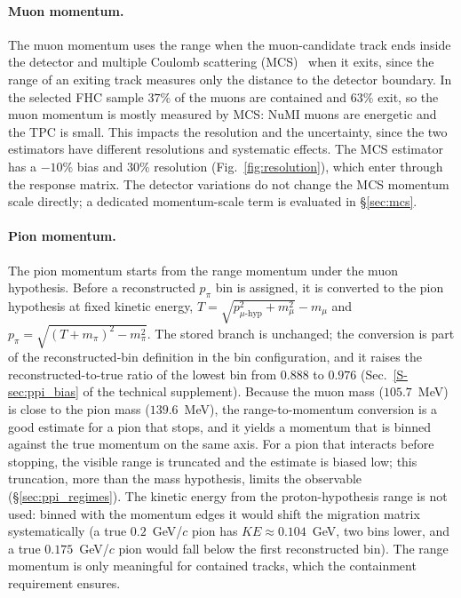\documentclass[11pt,a4paper]{article}
\newcommand{\suppref}[2]{#1~\ref{S-#2} of the technical supplement}
\begin{document}
\paragraph{Muon momentum.}
The muon momentum uses the range when the muon-candidate track ends inside the detector and
multiple Coulomb scattering (MCS)~\cite{uboone_mcs} when it exits, since the range of an exiting
track measures only the distance to the detector boundary. In the selected FHC sample $37\%$ of the
muons are contained and $63\%$ exit, so the muon momentum is mostly measured by MCS: NuMI muons are
energetic and the TPC is small. This impacts the resolution and the uncertainty, since the
two estimators have different resolutions and systematic effects. The MCS estimator has a $-10\%$
bias and $30\%$ resolution (Fig.~\ref{fig:resolution}), which enter through the response matrix.
The detector variations do not change the MCS momentum scale directly; a dedicated momentum-scale
term is evaluated in \S\ref{sec:mcs}.

\paragraph{Pion momentum.}
The pion momentum starts from the range momentum under the muon hypothesis. Before a
reconstructed $p_\pi$ bin is assigned, it is converted to the pion hypothesis at fixed kinetic
energy, $T=\sqrt{p_{\mu\text{-hyp}}^2+m_\mu^2}-m_\mu$ and $p_\pi=\sqrt{(T+m_\pi)^2-m_\pi^2}$. The
stored branch is unchanged; the conversion is part of the reconstructed-bin definition in the bin
configuration, and it raises the reconstructed-to-true ratio of the lowest bin from $0.888$ to
$0.976$ (\suppref{Sec.}{sec:ppi_bias}). Because the muon mass ($105.7$~MeV) is close to the pion
mass ($139.6$~MeV), the range-to-momentum conversion is a good estimate for a pion that stops, and
it yields a momentum that is binned against the true momentum on the same axis. For a pion that
interacts before stopping, the visible range is truncated and the estimate is biased low; this
truncation, more than the mass hypothesis, limits the observable (\S\ref{sec:ppi_regimes}). The kinetic energy
from the proton-hypothesis range is not used: binned with the momentum edges it would shift the
migration matrix systematically (a true $0.2$~GeV/$c$ pion has $KE\approx0.104$~GeV, two bins
lower, and a true $0.175$~GeV/$c$ pion would fall below the first reconstructed bin). The range
momentum is only meaningful for contained tracks, which the containment requirement ensures.
\end{document}
